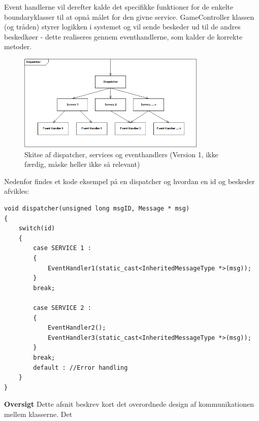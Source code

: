\documentclass[Softwaredesign/Softwaredesign_main.tex]{subfiles}
\begin{document}
Event handlerne vil derefter kalde det specifikke funktioner for de enkelte boundaryklasser til at opnå målet for den givne service. GameController klassen (og tråden) styrer logikken i systemet og vil sende beskeder ud til de andres beskedkøer - dette realiseres gennem eventhandlerne, som kalder de korrekte metoder. 
\begin{figure}[H]
    \centering
    \includegraphics[width=0.8\textwidth]{Softwaredesign/RPiApp/graphic_RPi/dispatch.png}
    \caption{Skitse af dispatcher, services og eventhandlers (Version 1, ikke færdig, måske heller ikke så relevant)}
    \label{fig:dispatch}
\end{figure}
Nedenfor findes et kode eksempel på en dispatcher og hvordan en id og beskeder afvikles: 
\begin{lstlisting}
void dispatcher(unsigned long msgID, Message * msg)
{
    switch(id) 
    {
        case SERVICE 1 :
        {
            EventHandler1(static_cast<InheritedMessageType *>(msg)); 
        }
        break;
        
        case SERVICE 2 : 
        {
            EventHandler2(); 
            EventHandler3(static_cast<InheritedMessageType *>(msg));
        }
        break;
        default : //Error handling
    }
}
\end{lstlisting}
\textbf{Oversigt}
Dette afsnit beskrev kort det overordnede design af kommunikationen mellem klasserne. Det 


\end{document}
